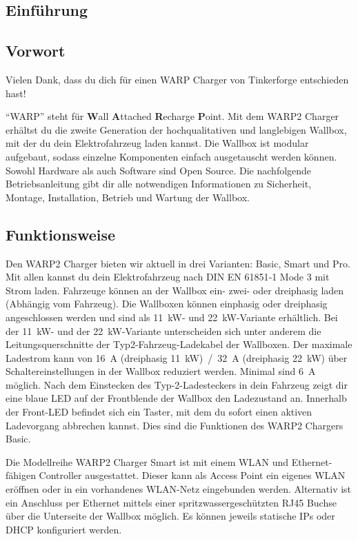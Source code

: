 \documentclass[a4paper,10pt]{article}
\begin{document}
\begin{multicols*}{2}
	\tableofcontents \section{Einführung}
	\subsection{Vorwort} Vielen Dank, dass du
	dich für einen WARP Charger von Tinkerforge entschieden hast!

	\enquote{WARP} steht
	für \textbf{W}all \textbf{A}ttached
	\textbf{R}echarge \textbf{P}oint. Mit dem WARP2 Charger
	erhältst du die zweite Generation der hochqualitativen und langlebigen Wallbox, 
	mit der du dein Elektrofahrzeug laden kannst. 
	Die Wallbox ist modular aufgebaut, sodass
	einzelne Komponenten einfach ausgetauscht werden können. Sowohl Hardware als
	auch Software sind Open Source. Die nachfolgende Betriebsanleitung gibt dir
	alle notwendigen Informationen zu Sicherheit, Montage, Installation, Betrieb
	und Wartung der Wallbox.

	\subsection{Funktionsweise}
	Den WARP2 Charger bieten wir aktuell in drei Varianten: Basic, Smart und Pro.
	Mit allen kannst du dein Elektrofahrzeug nach DIN EN 61851‐1 Mode 3 mit Strom
	laden. Fahrzeuge können an der Wallbox ein- zwei- oder dreiphasig laden
	(Abhängig vom Fahrzeug). Die Wallboxen können einphasig oder dreiphasig
	angeschlossen werden und sind als \SI{11}{\kilo\watt}- und
	\SI{22}{\kilo\watt}-Variante erhältlich. Bei der \SI{11}{\kilo\watt}- und
	der \SI{22}{\kilo\watt}-Variante unterscheiden sich unter anderem die
	Leitungsquerschnitte der Typ2-Fahrzeug-Ladekabel der Wallboxen. Der maximale Ladestrom
	kann von \SI{16}{\ampere}
	(dreiphasig \SI{11}{\kilo\watt})~/~\SI{32}{\ampere} (dreiphasig \SI{22}{\kilo\watt}) über
	Schaltereinstellungen in der Wallbox reduziert werden. Minimal sind
	\SI{6}{\ampere} möglich. Nach dem Einstecken des Typ-2-Ladesteckers in
	dein Fahrzeug zeigt dir eine blaue LED auf der Frontblende der Wallbox den
	Ladezustand an. Innerhalb der Front-LED befindet sich ein Taster, mit dem
	du sofort einen aktiven Ladevorgang abbrechen kannst. Dies sind die
	Funktionen des WARP2 Chargers Basic.

	Die Modellreihe WARP2 Charger Smart ist mit einem WLAN und
	Ethernet-fähigen Controller ausgestattet. 
	Dieser kann als \nohyphens{Access} Point ein eigenes WLAN eröffnen oder in
	ein vorhandenes WLAN-Netz eingebunden werden. Alternativ ist ein Anschluss
	per Ethernet mittels einer spritzwassergeschützten RJ45 Buchse über die
	Unterseite der Wallbox möglich. Es können jeweils statische IPs oder DHCP
	konfiguriert werden.


\end{multicols*}
\end{document}
